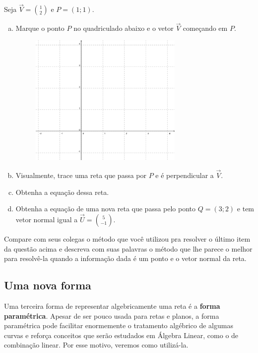 \documentclass[main_estudante.tex]{subfiles}
\begin{document}
\begin{questao}
Seja $\overrightarrow{V}=\binom{1}{2}$ e $P=(1;1)$.
\begin{enumerate}[a)]
\item Marque o ponto $P$ no quadriculado abaixo e o vetor $\overrightarrow{V}$ começando em $P$.

\begin{figure}[h]
\centering
\includegraphics[width=0.7\textwidth]{./img/c6q9.png}
\end{figure}

\item Visualmente, trace uma reta que passa por $P$ e é perpendicular a $\overrightarrow{V}$.
\item Obtenha a equação dessa reta.
\item Obtenha a equação de uma nova reta que passa pelo ponto $Q=(3;2)$ e tem vetor normal igual a $\overrightarrow{U}=\binom{5}{-1}$.
\end{enumerate}
\end{questao}

\begin{reflita}
 Compare com seus colegas o método que você utilizou pra resolver o último item da questão acima e descreva com suas palavras o método que lhe parece o melhor para resolvê-la quando a informação dada é um ponto e o vetor normal da reta.
\end{reflita}


\subsection*{Uma nova forma}

Uma terceira forma de representar algebricamente uma reta é a \textbf{forma paramétrica}. Apesar de ser pouco usada para retas e planos, a forma paramétrica pode facilitar enormemente o tratamento algébrico de algumas curvas e reforça conceitos que serão estudados em Álgebra Linear, como o de combinação linear. Por esse motivo, veremos como utilizá-la.
\end{document}
